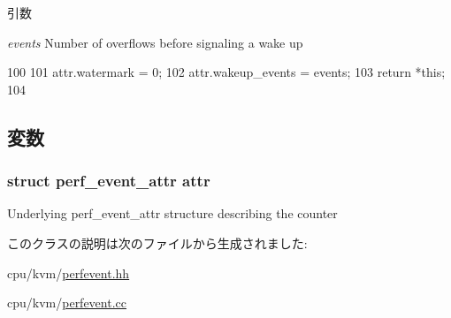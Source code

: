 \begin{DoxyParams}{引数}
\item[{\em events}]Number of overflows before signaling a wake up \end{DoxyParams}



\begin{DoxyCode}
100                                                         {
101         attr.watermark = 0;
102         attr.wakeup_events = events;
103         return *this;
104     }
\end{DoxyCode}


\subsection{変数}
\hypertarget{classPerfKvmCounterConfig_aeae272195c5a5879b216cef6c7c909b2}{
\subsubsection[{attr}]{\setlength{\rightskip}{0pt plus 5cm}struct perf\_\-event\_\-attr {\bf attr}}}
\label{classPerfKvmCounterConfig_aeae272195c5a5879b216cef6c7c909b2}
Underlying perf\_\-event\_\-attr structure describing the counter 

このクラスの説明は次のファイルから生成されました:\begin{DoxyCompactItemize}
\item 
cpu/kvm/\hyperlink{perfevent_8hh}{perfevent.hh}\item 
cpu/kvm/\hyperlink{perfevent_8cc}{perfevent.cc}\end{DoxyCompactItemize}
